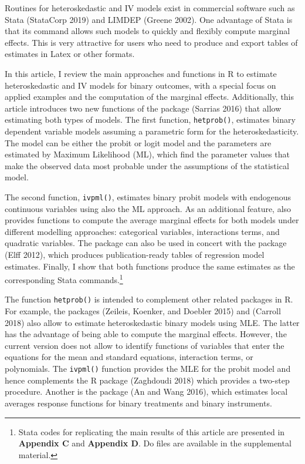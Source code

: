 Routines for heteroskedastic and IV models exist in commercial software such as Stata (StataCorp 2019) and LIMDEP (Greene 2002). One advantage of Stata is that its command  allows such models to quickly and flexibly compute marginal effects. This is very attractive for users who need to produce and export tables of estimates in Latex or other formats.

In this article, I review the main approaches and functions in R to estimate heteroskedastic and IV models for binary outcomes, with a special focus on applied examples and the computation of the marginal effects. Additionally, this article introduces two new functions of the  package (Sarrias 2016) that allow estimating both types of models. The first function, \texttt{hetprob()}, estimates binary dependent variable models assuming a parametric form for the heteroskedasticity. The model can be either the probit or logit model and the parameters are estimated by Maximum Likelihood (ML), which find the parameter values that make the observed data most probable under the assumptions of the statistical model.

The second function, \texttt{ivpml()}, estimates binary probit models with endogenous continuous variables using also the ML approach. As an additional feature,  also provides functions to compute the average marginal effects for both models under different modelling approaches: categorical variables, interactions terms, and quadratic variables. The package can also be used in concert with the  package (Elff 2012), which produces publication-ready tables of regression model estimates. Finally, I show that both functions produce the same estimates as the corresponding Stata commands.\footnote{Stata codes for replicating the main results of this article are presented in \textbf{Appendix C} and \textbf{Appendix D}. Do files are available in the supplemental material.}

The function \texttt{hetprob()} is intended to complement other related packages in R. For example, the packages  (Zeileis, Koenker, and Doebler 2015) and  (Carroll 2018) also allow to estimate heteroskedastic binary models using MLE. The latter has the advantage of being able to compute the marginal effects. However, the current version does not allow to identify functions of variables that enter the equations for the mean and standard equations, interaction terms, or polynomials. The \texttt{ivpml()} function provides the MLE for the probit model and hence complements the R package  (Zaghdoudi 2018) which provides a two-step procedure. Another is the  package (An and Wang 2016), which estimates local averages response functions for binary treatments and binary instruments.

